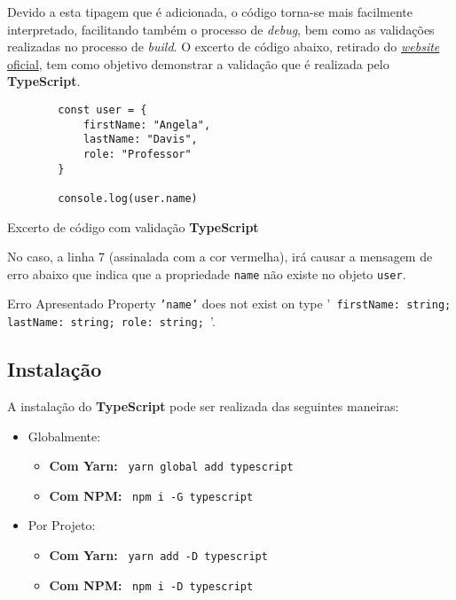 Devido a esta tipagem que é adicionada, o código torna-se mais facilmente interpretado, facilitando também o processo de \textit{debug}, bem como as validações realizadas no processo de \textit{build}. O excerto de código abaixo, retirado do \href{https://www.typescriptlang.org}{\textit{website} oficial}, tem como objetivo demonstrar a validação que é realizada pelo \textbf{TypeScript}.

\begin{longlisting}
	\begin{verbatim}
		const user = {
			firstName: "Angela",
			lastName: "Davis",
			role: "Professor"
		}

		console.log(user.name)
	\end{verbatim}

	\caption{Excerto de código com validação \textbf{TypeScript}}
\end{longlisting}

No caso, a linha 7 (assinalada com a cor vermelha), irá causar a mensagem de erro abaixo que indica que a propriedade \texttt{name} não existe no objeto \texttt{user}.

\begin{errorbox}{Erro Apresentado}
	Property \texttt{'name'} does not exist on type '\texttt{{ firstName: string; lastName: string; role: string; }}'.
\end{errorbox}

\subsection{Instalação}

A instalação do \textbf{TypeScript} pode ser realizada das seguintes maneiras:

\begin{itemize}
	\item Globalmente:
	\begin{itemize}
		\item \textbf{Com Yarn:} ~\texttt{yarn global add typescript}
		\item \textbf{Com NPM:} ~\texttt{npm i -G typescript}
	\end{itemize}
	\item Por Projeto:
	\begin{itemize}
		\item \textbf{Com Yarn:} ~\texttt{yarn add -D typescript}
		\item \textbf{Com NPM:} ~\texttt{npm i -D typescript}
	\end{itemize}
\end{itemize}

